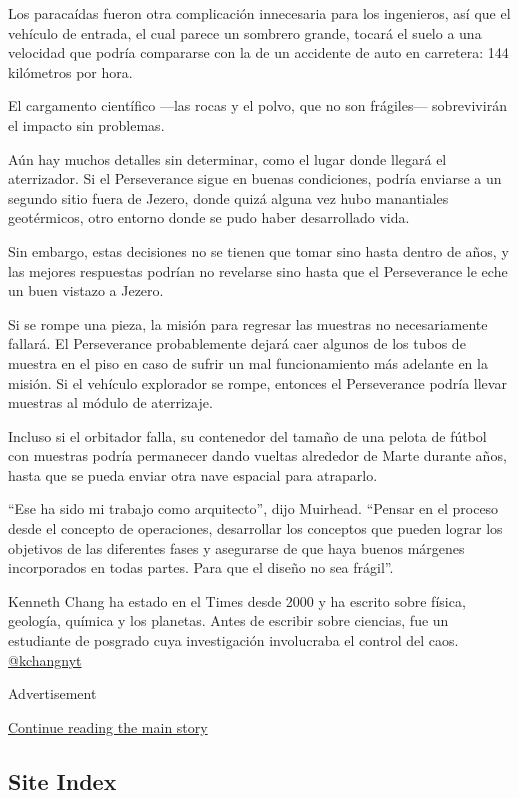 Los paracaídas fueron otra complicación innecesaria para los ingenieros,
así que el vehículo de entrada, el cual parece un sombrero grande,
tocará el suelo a una velocidad que podría compararse con la de un
accidente de auto en carretera: 144 kilómetros por hora.

El cargamento científico ---las rocas y el polvo, que no son frágiles---
sobrevivirán el impacto sin problemas.

Aún hay muchos detalles sin determinar, como el lugar donde llegará el
aterrizador. Si el Perseverance sigue en buenas condiciones, podría
enviarse a un segundo sitio fuera de Jezero, donde quizá alguna vez hubo
manantiales geotérmicos, otro entorno donde se pudo haber desarrollado
vida.

Sin embargo, estas decisiones no se tienen que tomar sino hasta dentro
de años, y las mejores respuestas podrían no revelarse sino hasta que el
Perseverance le eche un buen vistazo a Jezero.

Si se rompe una pieza, la misión para regresar las muestras no
necesariamente fallará. El Perseverance probablemente dejará caer
algunos de los tubos de muestra en el piso en caso de sufrir un mal
funcionamiento más adelante en la misión. Si el vehículo explorador se
rompe, entonces el Perseverance podría llevar muestras al módulo de
aterrizaje.

Incluso si el orbitador falla, su contenedor del tamaño de una pelota de
fútbol con muestras podría permanecer dando vueltas alrededor de Marte
durante años, hasta que se pueda enviar otra nave espacial para
atraparlo.

``Ese ha sido mi trabajo como arquitecto'', dijo Muirhead. ``Pensar en
el proceso desde el concepto de operaciones, desarrollar los conceptos
que pueden lograr los objetivos de las diferentes fases y asegurarse de
que haya buenos márgenes incorporados en todas partes. Para que el
diseño no sea frágil''.

Kenneth Chang ha estado en el Times desde 2000 y ha escrito sobre
física, geología, química y los planetas. Antes de escribir sobre
ciencias, fue un estudiante de posgrado cuya investigación involucraba
el control del caos. \href{https://twitter.com/kchangnyt}{@kchangnyt}

Advertisement

\protect\hyperlink{after-bottom}{Continue reading the main story}

\hypertarget{site-index}{%
\subsection{Site Index}\label{site-index}}

